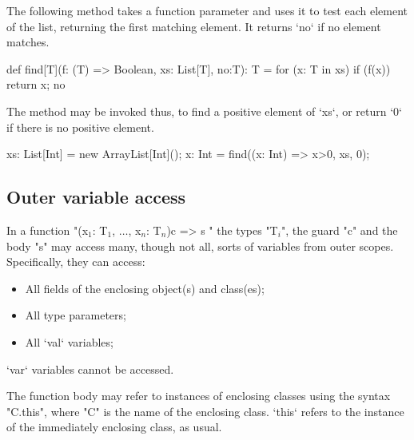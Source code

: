 \begin{ex}
The following method takes a function parameter and uses it to
test each element of the list, returning the first matching
element.  It returns \xcd`no` if no element matches.

\begin{xten}
def find[T](f: (T) => Boolean, xs: List[T], no:T): T = {
  for (x: T in xs)
    if (f(x)) return x;
  no
  }
\end{xten}

The method may be invoked thus, to find a positive element of \xcd`xs`, or
return \xcd`0` if there is no positive element.
\begin{xten}
xs: List[Int] = new ArrayList[Int]();
x: Int = find((x: Int) => x>0, xs, 0);
\end{xten}

\end{ex}



\subsection{Outer variable access}

In a function
\xcdmath"(x$_1$: T$_1$, $\dots$, x$_n$: T$_n$){c} => { s }"
the types \xcdmath"T$_i$", the guard \xcd"c" and the body \xcd"s"
may access many, though not all, sorts of variables from outer scopes.  
Specifically, they can access: 
\begin{itemize}
\item All fields of the enclosing object(s) and class(es);
\item All type parameters;
\item All \xcd`val` variables;
\end{itemize}
\noindent
\xcd`var` variables cannot be accessed.


The function body may refer to instances of enclosing classes using
the syntax \xcd"C.this", where \xcd"C" is the name of the
enclosing class.  \xcd`this` refers to the instance of the immediately
enclosing class, as usual.


